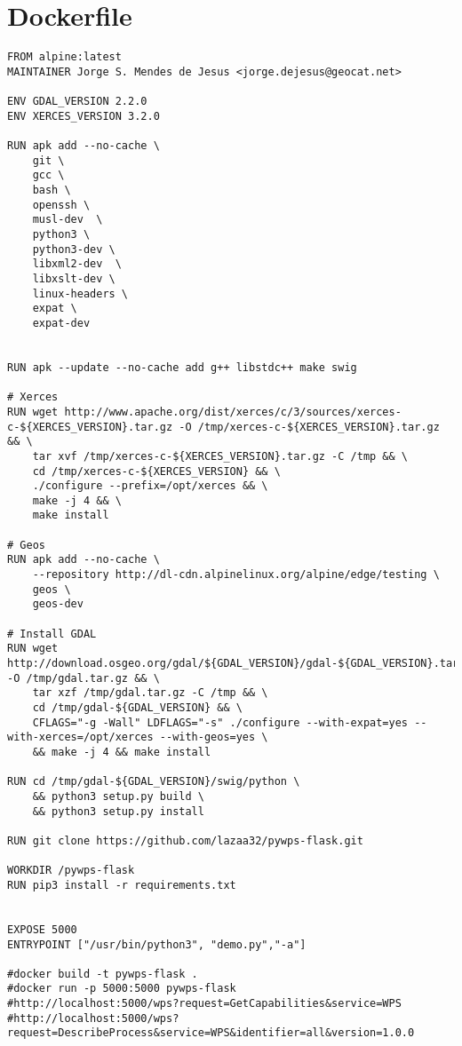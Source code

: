 \newpage
\section{Dockerfile}
\label{app:dockerfile}
\begin{lstlisting}[basicstyle=\small,caption={Dockerfile example}]
FROM alpine:latest
MAINTAINER Jorge S. Mendes de Jesus <jorge.dejesus@geocat.net>

ENV GDAL_VERSION 2.2.0
ENV XERCES_VERSION 3.2.0

RUN apk add --no-cache \
	git \
	gcc \
	bash \
	openssh \
	musl-dev  \
	python3 \
	python3-dev \
	libxml2-dev  \
	libxslt-dev \
	linux-headers \
	expat \
	expat-dev


RUN apk --update --no-cache add g++ libstdc++ make swig

# Xerces
RUN wget http://www.apache.org/dist/xerces/c/3/sources/xerces-c-${XERCES_VERSION}.tar.gz -O /tmp/xerces-c-${XERCES_VERSION}.tar.gz && \
    tar xvf /tmp/xerces-c-${XERCES_VERSION}.tar.gz -C /tmp && \
    cd /tmp/xerces-c-${XERCES_VERSION} && \
    ./configure --prefix=/opt/xerces && \
    make -j 4 && \
    make install

# Geos
RUN apk add --no-cache \
    --repository http://dl-cdn.alpinelinux.org/alpine/edge/testing \
    geos \
    geos-dev

# Install GDAL
RUN wget http://download.osgeo.org/gdal/${GDAL_VERSION}/gdal-${GDAL_VERSION}.tar.gz -O /tmp/gdal.tar.gz && \
	tar xzf /tmp/gdal.tar.gz -C /tmp && \
	cd /tmp/gdal-${GDAL_VERSION} && \
	CFLAGS="-g -Wall" LDFLAGS="-s" ./configure --with-expat=yes --with-xerces=/opt/xerces --with-geos=yes \
	&& make -j 4 && make install

RUN cd /tmp/gdal-${GDAL_VERSION}/swig/python \
	&& python3 setup.py build \
	&& python3 setup.py install

RUN git clone https://github.com/lazaa32/pywps-flask.git

WORKDIR /pywps-flask
RUN pip3 install -r requirements.txt


EXPOSE 5000
ENTRYPOINT ["/usr/bin/python3", "demo.py","-a"]

#docker build -t pywps-flask .
#docker run -p 5000:5000 pywps-flask
#http://localhost:5000/wps?request=GetCapabilities&service=WPS
#http://localhost:5000/wps?request=DescribeProcess&service=WPS&identifier=all&version=1.0.0
\end{lstlisting}

\newpage
